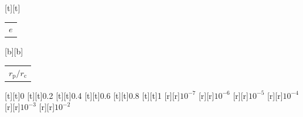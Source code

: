 %    
%
%
\begin{psfrags}%
\psfragscanon%
%
[t][t]{\color[rgb]{0,0,0}\setlength{\tabcolsep}{0pt}\begin{tabular}{c}{\Large$e$}\end{tabular}}%
[b][b]{\color[rgb]{0,0,0}\setlength{\tabcolsep}{0pt}\begin{tabular}{c}{\Large$r_\mathrm{p}/r_\mathrm{c}$}\end{tabular}}%
%
[t][t]{0}%
[t][t]{0.2}%
[t][t]{0.4}%
[t][t]{0.6}%
[t][t]{0.8}%
[t][t]{1}%
%
[r][r]{$10^{-7}$}%
[r][r]{$10^{-6}$}%
[r][r]{$10^{-5}$}%
[r][r]{$10^{-4}$}%
[r][r]{$10^{-3}$}%
[r][r]{$10^{-2}$}%
%
%
\end{psfrags}%
%
